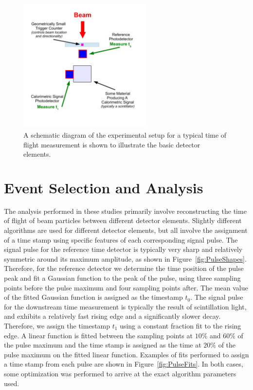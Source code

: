 \documentclass[12pt]{article}
\begin{document}
\begin{figure}[h] \centering
\includegraphics[width=0.6\textwidth]{figs/TypicalSchematicDiagram} 
\caption{A schematic diagram of the experimental setup for
a typical time of flight measurement is shown to illustrate the
basic detector elements.} 
\label{fig:TypicalSchematicDiagram}
\end{figure}

\section{Event Selection and Analysis}

The analysis performed in these studies primarily involve
reconstructing the time of flight of beam particles
between different detector elements. Slightly different
algorithms are used for different detector elements,
but all involve the assignment of a time stamp using 
specific features of each corresponding signal pulse.
The signal pulse for the reference time detector
is typically very sharp and relatively symmetric 
around its maximum amplitude, as shown in 
Figure~\ref{fig:PulseShapes}. Therefore, for the reference 
detector we determine the time position of the pulse
peak and fit a Gaussian function to the peak
of the pulse, using three sampling points before the 
pulse maximum and four sampling points after. The
mean value of the fitted Gaussian function is
assigned as the timestamp $t_{0}$. The signal pulse
for the downstream time measurement is typically
the result of scintillation light, and exhibits a 
relatively fast rising edge and a significantly slower
decay. Therefore, we assign the timestamp $t_{1}$ 
using a constant fraction fit to the rising edge.
A linear function is fitted between the sampling
points at $10\%$ and $60\%$ of the pulse maximum
and the time stamp is assigned as the time 
at $20\%$ of the pulse maximum on the fitted
linear function. Examples of fits performed to assign a 
time stamp from each pulse are shown in Figure~\ref{fig:PulseFits}.
In both cases, some optimization was performed 
to arrive at the exact algorithm parameters used.
\end{document}
